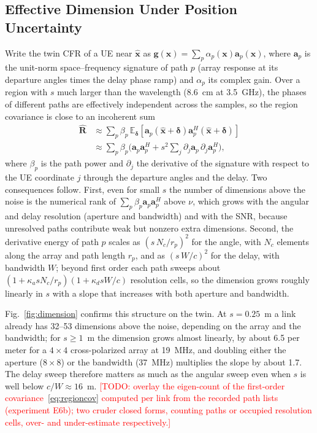 \documentclass[journal]{IEEEtran}
\newcommand{\todo}[1]{\textcolor{red}{[TODO: #1]}}
\newcommand{\vect}[1]{\mathbf{#1}}
\newcommand{\E}{\mathbb{E}}
\begin{document}
\subsection{Effective Dimension Under Position Uncertainty}
Write the twin CFR of a UE near $\hat{\vect{x}}$ as $\vect{g}(\vect{x})=\sum_p\alpha_p(\vect{x})\vect{a}_p(\vect{x})$, where $\vect{a}_p$ is the unit-norm space--frequency signature of path $p$ (array response at its departure angles times the delay phase ramp) and $\alpha_p$ its complex gain. Over a region with $s$ much larger than the wavelength (8.6~cm at 3.5~GHz), the phases of different paths are effectively independent across the samples, so the region covariance is close to an incoherent sum
\begin{equation}\label{eq:regioncov}
\begin{aligned}
\hat{\vect{R}}&\approx\sum_p\beta_p\,\E_{\vect{\delta}}\!\left[\vect{a}_p(\hat{\vect{x}}+\vect{\delta})\vect{a}_p^{H}(\hat{\vect{x}}+\vect{\delta})\right]\\
&\approx\sum_p\beta_p\Big(\vect{a}_p\vect{a}_p^{H}+s^2\sum_{j}\partial_j\vect{a}_p\,\partial_j\vect{a}_p^{H}\Big),
\end{aligned}
\end{equation}
where $\beta_p$ is the path power and $\partial_j$ the derivative of the signature with respect to the UE coordinate $j$ through the departure angles and the delay. Two consequences follow. First, even for small $s$ the number of dimensions above the noise is the numerical rank of $\sum_p\beta_p\vect{a}_p\vect{a}_p^{H}$ above $\nu$, which grows with the angular and delay resolution (aperture and bandwidth) and with the SNR, because unresolved paths contribute weak but nonzero extra dimensions. Second, the derivative energy of path $p$ scales as $(s\,N_c/r_p)^2$ for the angle, with $N_c$ elements along the array and path length $r_p$, and as $(s\,W/c)^2$ for the delay, with bandwidth $W$; beyond first order each path sweeps about $(1+\kappa_a sN_c/r_p)(1+\kappa_d sW/c)$ resolution cells, so the dimension grows roughly linearly in $s$ with a slope that increases with both aperture and bandwidth.

Fig.~\ref{fig:dimension} confirms this structure on the twin. At $s=0.25$~m a link already has 32--53 dimensions above the noise, depending on the array and the bandwidth; for $s\ge1$~m the dimension grows almost linearly, by about 6.5 per meter for a $4\times4$ cross-polarized array at 19~MHz, and doubling either the aperture ($8\times8$) or the bandwidth (37~MHz) multiplies the slope by about 1.7. The delay sweep therefore matters as much as the angular sweep even when $s$ is well below $c/W\approx16$~m. \todo{overlay the eigen-count of the first-order covariance~\eqref{eq:regioncov} computed per link from the recorded path lists (experiment E6b); two cruder closed forms, counting paths or occupied resolution cells, over- and under-estimate respectively.}
\end{document}
